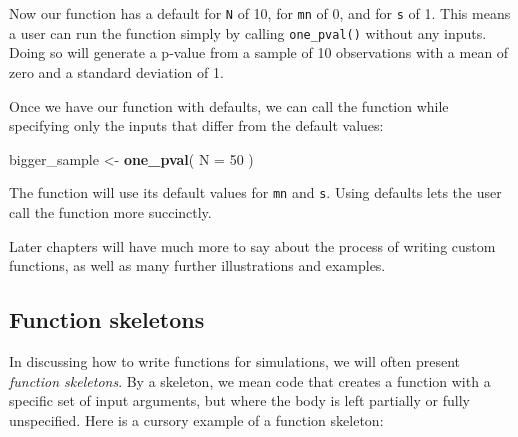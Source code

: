 \documentclass[
]{book}
\newenvironment{Shaded}{\begin{snugshade}}{\end{snugshade}}
\newcommand{\AttributeTok}[1]{\textcolor[rgb]{0.13,0.29,0.53}{#1}}
\newcommand{\ControlFlowTok}[1]{\textcolor[rgb]{0.13,0.29,0.53}{\textbf{#1}}}
\newcommand{\DecValTok}[1]{\textcolor[rgb]{0.00,0.00,0.81}{#1}}
\newcommand{\FunctionTok}[1]{\textcolor[rgb]{0.13,0.29,0.53}{\textbf{#1}}}
\newcommand{\NormalTok}[1]{#1}
\newcommand{\OtherTok}[1]{\textcolor[rgb]{0.56,0.35,0.01}{#1}}
\newcommand{\SpecialCharTok}[1]{\textcolor[rgb]{0.81,0.36,0.00}{\textbf{#1}}}
\begin{document}
\begin{Shaded}
\end{Shaded}

Now our function has a default for \texttt{N} of 10, for \texttt{mn} of 0, and for \texttt{s} of 1.
This means a user can run the function simply by calling \texttt{one\_pval()} without any inputs. Doing so will generate a p-value from a sample of 10 observations with a mean of zero and a standard deviation of 1.

Once we have our function with defaults, we can call the function while specifying only the inputs that differ from the default values:

\begin{Shaded}
\begin{Highlighting}[]
\NormalTok{bigger\_sample }\OtherTok{\textless{}{-}} \FunctionTok{one\_pval}\NormalTok{( }\AttributeTok{N =} \DecValTok{50}\NormalTok{ )}
\end{Highlighting}
\end{Shaded}

The function will use its default values for \texttt{mn} and \texttt{s}.
Using defaults lets the user call the function more succinctly.

Later chapters will have much more to say about the process of writing custom functions, as well as many further illustrations and examples.

\subsection{Function skeletons}\label{function-skeletons}

In discussing how to write functions for simulations, we will often present \emph{function skeletons}. By a skeleton, we mean code that creates a function with a specific set of input arguments, but where the body is left partially or fully unspecified.
Here is a cursory example of a function skeleton:
\end{document}
